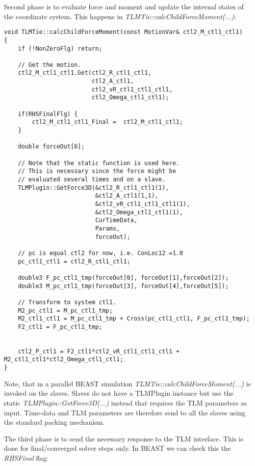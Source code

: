 Second phase is to evaluate force and moment and update the internal states of the coordinate system. 
This happens in {\em TLMTie::calcChildForceMoment(...)}:

{\scriptsize
\begin{verbatim}
void TLMTie::calcChildForceMoment(const MotionVar& ctl2_M_ctl1_ctl1)
{
    if (!NonZeroFlg) return;

    // Get the motion.
    ctl2_M_ctl1_ctl1.Get(ctl2_R_ctl1_ctl1,
                         ctl2_A_ctl1,
                         ctl2_vR_ctl1_ctl1_ctl1,
                         ctl2_Omega_ctl1_ctl1);

    if(RHSFinalFlg) {
        ctl2_M_ctl1_ctl1_Final =  ctl2_M_ctl1_ctl1;
    }

    double forceOut[6];

    // Note that the static function is used here.
    // This is necessary since the force might be
    // evaluated several times and on a slave.
    TLMPlugin::GetForce3D(&ctl2_R_ctl1_ctl1(1),
                          &ctl2_A_ctl1(1,1),
                          &ctl2_vR_ctl1_ctl1_ctl1(1),
                          &ctl2_Omega_ctl1_ctl1(1),
                          CurTimeData,
                          Params,
                          forceOut);

    // pc is equal ctl2 for now, i.e. ConLoc12 =1.0
    pc_ctl1_ctl1 = ctl2_R_ctl1_ctl1;

    double3 F_pc_ctl1_tmp(forceOut[0], forceOut[1],forceOut[2]);
    double3 M_pc_ctl1_tmp(forceOut[3], forceOut[4],forceOut[5]);

    // Transform to system ctl1.
    M2_pc_ctl1 = M_pc_ctl1_tmp;
    M2_ctl1_ctl1 = M_pc_ctl1_tmp + Cross(pc_ctl1_ctl1, F_pc_ctl1_tmp);
    F2_ctl1 = F_pc_ctl1_tmp;


    ctl2_P_ctl1 = F2_ctl1*ctl2_vR_ctl1_ctl1_ctl1 + M2_ctl1_ctl1*ctl2_Omega_ctl1_ctl1;
}
\end{verbatim}
}

Note, that in a parallel BEAST simulation {\em TLMTie::calcChildForceMoment(...)} is invoked on the slaves. 
Slaves do not have a TLMPlugin instance but use the static {\em TLMPlugin::GetForce3D(...)} instead that requires the TLM parameters as input. 
Time-data and TLM parameters are therefore send to all the slaves using the standard packing mechanism.

The third phase is to send the necessary response to the TLM interface. 
This is done for final/converged solver steps only. 
In BEAST we can check this the {\em RHSFinal} flag:

